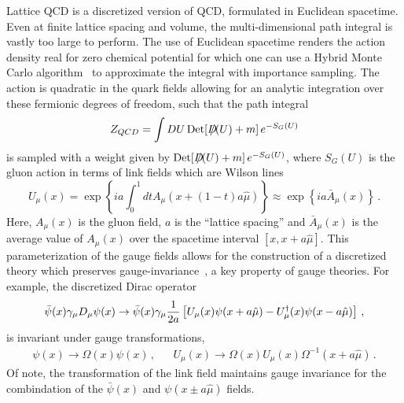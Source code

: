 Lattice QCD is a discretized version of QCD, formulated in Euclidean spacetime.
Even at finite lattice spacing and volume, the multi-dimensional path integral is vastly too large to perform.
The use of Euclidean spacetime renders the action density real for zero chemical potential for which one can use a Hybrid Monte Carlo algorithm~\cite{Duane:1987de} to approximate the integral with importance sampling.
The action is quadratic in the quark fields allowing for an analytic integration over these fermionic degrees of freedom, such that the path integral
\begin{equation}\label{eq:Z_QCD}
Z_{QCD} = \int D U\, {\rm Det}[\Dslash(U) + m]\, e^{-S_G(U)}
\end{equation}
is sampled with a weight given by ${\rm Det}[D\hskip-0.65em /(U) + m]\, e^{-S_G(U)}$, where $S_G(U)$ is the gluon action in terms of link fields which are Wilson lines
\begin{equation}
U_\mu(x) = \exp\left\{i a\int_0^1 dt A_\mu(x +(1-t)a\hat{\mu}) \right\}
    \approx \exp\left\{i a \bar{A}_\mu(x) \right\}\, .
\end{equation}
Here, $A_\mu(x)$ is the gluon field, $a$ is the ``lattice spacing'' and $\bar{A}_\mu(x)$ is the average value of $A_\mu(x)$ over the spacetime interval $[x, x+a\hat{\mu}]$.
This parameterization of the gauge fields allows for the construction of a discretized theory which preserves gauge-invariance~\cite{Wilson:1974sk}, a key property of gauge theories.
For example, the discretized Dirac operator
\begin{equation}\label{eq:naive_fermions}
\bar{\psi}(x)\g_\mu D_\mu \psi(x) \rightarrow
\bar{\psi}(x)\g_\mu\frac{1}{2a}\left[U_\mu(x)\psi(x+a\hat{\mu}) -U^\dagger_\mu(x)\psi(x-a\hat{\mu}) \right]\, ,
\end{equation}
is invariant under gauge transformations,
\begin{align}
&\psi(x)\rightarrow \Omega(x)\psi(x)\, ,&
&U_\mu(x)\rightarrow \Omega(x)U_\mu(x)\Omega^{-1}(x+a\hat{\mu})\, .&
\end{align}
Of note, the transformation of the link field maintains gauge invariance for the combindation of the $\bar{\psi}(x)$ and $\psi(x\pm a\hat{\mu})$ fields.


